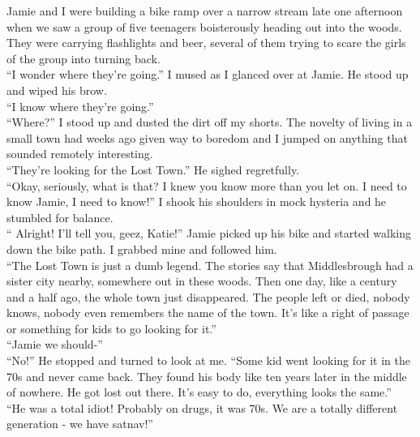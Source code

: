 \documentclass[a5paper]{scrartcl}
\begin{document}
Jamie and I were building a bike ramp over a narrow stream late one afternoon when we saw a group of five teenagers boisterously heading out into the woods. They were carrying flashlights and beer, several of them trying to scare the girls of  the group into turning back.\\


\enquote{I wonder where they're going.} I mused as I glanced over at Jamie. He stood up and wiped his brow. \\


\enquote{I know where they're going.}\\


\enquote{Where?} I stood up and dusted the dirt off my shorts. The novelty of living in a small town had weeks ago given way to boredom and I jumped on anything that sounded remotely interesting.  \\


\enquote{They're looking for the Lost Town.} He sighed regretfully.\\


\enquote{Okay, seriously, what is that? I knew you know more than you let on. I need to know Jamie, I need to know!} I shook his shoulders in mock hysteria and he stumbled for balance.\\


\enquote{ Alright! I'll tell you, geez, Katie!} Jamie picked up his bike and started walking down the bike path. I grabbed mine and followed him.\\


\enquote{The Lost Town is just a dumb legend.  The stories say that Middlesbrough had a sister city nearby, somewhere out in these woods. Then one day, like a century and a half ago, the whole town just disappeared. The people left or died, nobody knows, nobody even remembers the name of the town. It's like a right of passage or something for kids to go looking for it.}\\


\enquote{Jamie we should-}\\


\enquote{No!} He stopped and turned to look at me. \enquote{Some kid went looking for it in the 70s and never came back. They found his body like ten years later in the middle of nowhere. He got lost out there. It's easy to do, everything looks the same.}\\


\enquote{He was a total idiot! Probably on drugs, it was 70s. We are a totally different generation - we have satnav!}\\
\end{document}

